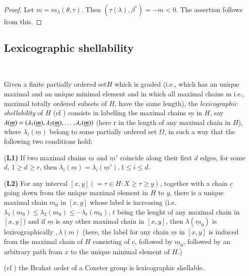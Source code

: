 \begin{proof}
Let $m=m_{\lambda}(\theta,\tau)$. Then $(\tau(\lambda), \beta^{*})= -m < 0$. The assertion follows from this.
\end{proof}

\setcounter{subsection}{5}
\subsection{Lexicographic shellability}\label{art9-subsec-2.6}
~

Given a finite partially ordered set$H$ which is graded (i.e., which has an unique maximal and an unique minimal element and in which all maximal chains m i.e., maximal totally ordered subsets of $H$, have the same length), the
\textit{lexicographic shellability} of $H$ (cf \cite{art9-keyB-W}) consists in labelling the maximal chains $\underline{m}$ in $H$, say $\lambda(\underline{m})= (\lambda_{1}(\underline{m}), \lambda_{2}(\underline{m}), \ldots, \break \lambda_{r}(\underline{m}))$ (here r in the length of any maximal chain in $H$), where $\lambda_{i}(\underline{m})$ belong to some partially ordered set $\Omega$, in such a way that the following two conditions hold:

\noindent
{(\bf L1)} If two maximal chains $\underline{m}$ and $\underline{m}'$ coincide along their first $d$ edges, for some $d$, $1 \geq d \geq r$, then $\lambda_{i}(\underline{m})= \lambda_{i}(\underline{m}'), 1 \leq i \leq d$.

\noindent
{(\bf L2)} For any interval $[x,y](= \tau \in H : X\geq \tau \geq y)$, together with a chain $\underline{c}$ going down from the unique maximal element in $H$ to $y$, there is a unique maximal chain $m_{0}$ in $[x,y]$ whose label is increasing (i.e. $\lambda_{1}(m_{0})\leq \lambda_{2}(m_{0})\leq \cdots \lambda_{t}(m_{0})$, $t$ being the lenght of any maximal chain in $[x,y]$) and if $\underline{m}$ is any other maximal chain in $[x,y]$, then $\lambda(\underline{m}_{0})$ is lexicographically $, \lambda(m)$ (here, the label for any chain $\underline{m}$ in $[x,y]$ is induced from the maximal chain of $H$ consisting of $\underline{c}$, followed by $\underline{m}_{0}$, followed by an arbitrary path from $x$ to the unique minimal element of $H$.) 

\setcounter{equation}{6}
\begin{theorem}\label{art9-thm-2.7}
 {\rm(cf \cite{art9-keyB-W})} the Bruhat order of a Coxeter group is lexicographic shellable.
\end{theorem}

